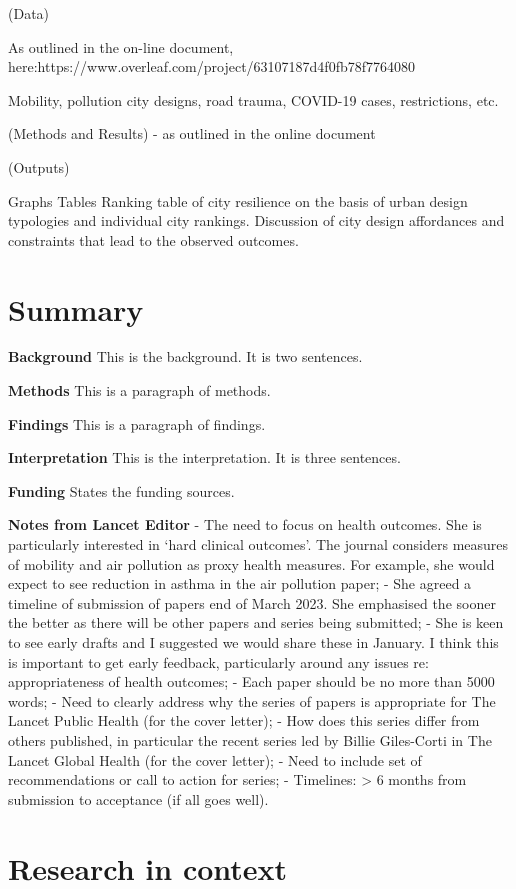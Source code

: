 \documentclass[preprint,12pt]{elsarticle}
\begin{document}
(Data)

As outlined in the on-line document, here:https://www.overleaf.com/project/63107187d4f0fb78f7764080

Mobility, pollution city designs, road trauma, COVID-19 cases, restrictions, etc.

(Methods and Results) - as outlined in the online document

(Outputs)

    Graphs
    Tables
    Ranking table of city resilience on the basis of urban design typologies and individual city rankings.
    Discussion of city design affordances and constraints that lead to the observed outcomes.


\section*{Summary}
\textbf{Background} This is the background. It is two sentences.

\textbf{Methods} This is a paragraph of methods.


\textbf{Findings} This is a paragraph of findings.

\textbf{Interpretation} This is the interpretation. It is three sentences.

\textbf{Funding} States the funding sources.

\textbf{Notes from Lancet Editor} 
-	The need to focus on health outcomes. She is particularly interested in ‘hard clinical outcomes’. The journal considers measures of mobility and air pollution as proxy health measures. For example, she would expect to see reduction in asthma in the air pollution paper; 
-	She agreed a timeline of submission of papers end of March 2023. She emphasised the sooner the better as there will be other papers and series being submitted; 
-	She is keen to see early drafts and I suggested we would share these in January. I think this is important to get early feedback, particularly around any issues re: appropriateness of health outcomes;
-	Each paper should be no more than 5000 words;
-	Need to clearly address why the series of papers is appropriate for The Lancet Public Health (for the cover letter);
-	How does this series differ from others published, in particular the recent series led by Billie Giles-Corti in The Lancet Global Health (for the cover letter);
-	Need to include set of recommendations or call to action for series;
-	Timelines: > 6 months from submission to acceptance (if all goes well).


\section*{Research in context}
\end{document}
